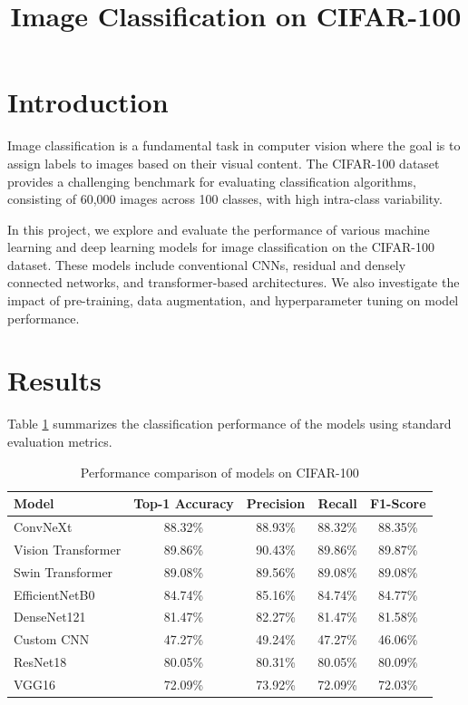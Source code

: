\documentclass[11pt]{article}
\title{\textbf{Image Classification on CIFAR-100}}
\author{}
\date{}
\begin{document}
\maketitle

\section{Introduction}

Image classification is a fundamental task in computer vision where the goal is to assign labels to images based on their visual content. The CIFAR-100 dataset provides a challenging benchmark for evaluating classification algorithms, consisting of 60,000 images across 100 classes, with high intra-class variability.

In this project, we explore and evaluate the performance of various machine learning and deep learning models for image classification on the CIFAR-100 dataset. These models include conventional CNNs, residual and densely connected networks, and transformer-based architectures. We also investigate the impact of pre-training, data augmentation, and hyperparameter tuning on model performance.

\section{Results}

Table \ref{tab:results} summarizes the classification performance of the models using standard evaluation metrics.

\begin{table}[H]
\centering
\caption{Performance comparison of models on CIFAR-100}
\label{tab:results}
\begin{tabular}{lcccc}
\toprule
\textbf{Model} & \textbf{Top-1 Accuracy} & \textbf{Precision} & \textbf{Recall} & \textbf{F1-Score} \\
\midrule
ConvNeXt            & 88.32\% & 88.93\% & 88.32\% & 88.35\% \\
Vision Transformer  & 89.86\% & 90.43\% & 89.86\% & 89.87\% \\
Swin Transformer    & 89.08\% & 89.56\% & 89.08\% & 89.08\% \\
EfficientNetB0      & 84.74\% & 85.16\% & 84.74\% & 84.77\% \\
DenseNet121         & 81.47\% & 82.27\% & 81.47\% & 81.58\% \\
Custom CNN          & 47.27\% & 49.24\% & 47.27\% & 46.06\% \\
ResNet18            & 80.05\% & 80.31\% & 80.05\% & 80.09\% \\
VGG16               & 72.09\% & 73.92\% & 72.09\% & 72.03\% \\
\bottomrule
\end{tabular}
\end{table}
\end{document}

